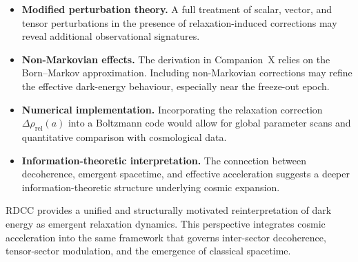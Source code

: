 \documentclass[11pt,a4paper]{article}
\begin{document}
\begin{itemize}
    \item \textbf{Modified perturbation theory.}
    A full treatment of scalar, vector, and tensor perturbations in the presence
    of relaxation-induced corrections may reveal additional observational
    signatures.

    \item \textbf{Non-Markovian effects.}
    The derivation in Companion~X relies on the Born--Markov approximation.
    Including non-Markovian corrections may refine the effective dark-energy
    behaviour, especially near the freeze-out epoch.

    \item \textbf{Numerical implementation.}
    Incorporating the relaxation correction $\Delta\rho_{\mathrm{rel}}(a)$ into a
    Boltzmann code would allow for global parameter scans and quantitative
    comparison with cosmological data.

    \item \textbf{Information-theoretic interpretation.}
    The connection between decoherence, emergent spacetime, and effective
    acceleration suggests a deeper information-theoretic structure underlying
    cosmic expansion.
\end{itemize}

RDCC provides a unified and structurally motivated reinterpretation of dark
energy as emergent relaxation dynamics. This perspective integrates cosmic
acceleration into the same framework that governs inter-sector decoherence,
tensor-sector modulation, and the emergence of classical spacetime.



\end{document}
